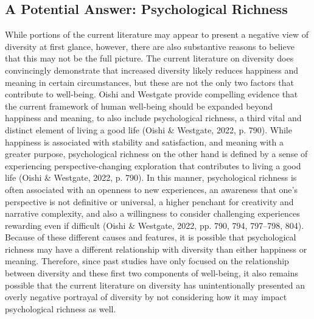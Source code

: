 \documentclass[
  man]{apa6}
\begin{document}
\hypertarget{a-potential-answer-psychological-richness}{%
\subsection{A Potential Answer: Psychological Richness}\label{a-potential-answer-psychological-richness}}

While portions of the current literature may appear to present a negative view of diversity at first glance, however, there are also substantive reasons to believe that this may not be the full picture. The current literature on diversity does convincingly demonstrate that increased diversity likely reduces happiness and meaning in certain circumstances, but these are not the only two factors that contribute to well-being. Oishi and Westgate provide compelling evidence that the current framework of human well-being should be expanded beyond happiness and meaning, to also include psychological richness, a third vital and distinct element of living a good life (Oishi \& Westgate, 2022, p. 790). While happiness is associated with stability and satisfaction, and meaning with a greater purpose, psychological richness on the other hand is defined by a sense of experiencing perspective-changing exploration that contributes to living a good life (Oishi \& Westgate, 2022, p. 790). In this manner, psychological richness is often associated with an openness to new experiences, an awareness that one's perspective is not definitive or universal, a higher penchant for creativity and narrative complexity, and also a willingness to consider challenging experiences rewarding even if difficult (Oishi \& Westgate, 2022, pp. 790, 794, 797--798, 804). Because of these different causes and features, it is possible that psychological richness may have a different relationship with diversity than either happiness or meaning. Therefore, since past studies have only focused on the relationship between diversity and these first two components of well-being, it also remains possible that the current literature on diversity has unintentionally presented an overly negative portrayal of diversity by not considering how it may impact psychological richness as well.
\end{document}
